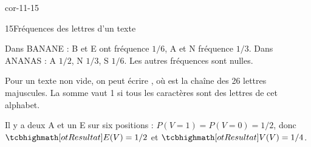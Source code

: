 \begin{blocLivre}{cor-11-15}
\begin{corrige}{15}{Fréquences des lettres d'un texte}
\begin{questions}
\item Dans BANANE : B et E ont fréquence $1/6$, A et N fréquence $1/3$. Dans ANANAS : A $1/2$, N $1/3$, S $1/6$. Les autres fréquences sont nulles.
\item Pour un texte non vide, on peut écrire , où  est la chaîne des 26 lettres majuscules. La somme vaut 1 si tous les caractères sont des lettres de cet alphabet.
\item Il y a deux A et un E sur six positions : $P(V=1)=P(V=0)=1/2$, donc $\res{E(V)=1/2}$ et $\res{V(V)=1/4}$.
\end{questions}
\end{corrige}
\end{blocLivre}
